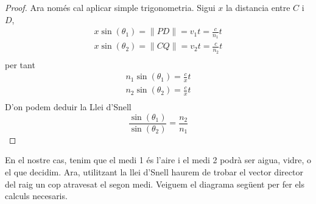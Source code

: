 \documentclass{article}
\begin{document}
\begin{proof}
Ara només cal aplicar simple trigonometria. Sigui $x$ la distancia entre  $C$ i  $D$,
 \begin{align*}
    x \sin(\theta_1) = \|PD\| = v_1t= \frac{c}{n_1} t  \\
    x \sin(\theta_2) = \|CQ\| = v_2t= \frac{c}{n_2} t  \\
\end{align*}
per tant 
\begin{align*}
   n_1 \sin(\theta_1) = \frac{c}{x}t \\
   n_2 \sin(\theta_2) = \frac{c}{x}t \\
\end{align*}
D'on podem deduir la Llei d'Snell
  \begin{equation*}
     \frac{\sin(\theta_1)}{\sin(\theta_2)}= \frac{n_2}{n_1}
  \end{equation*} 
\end{proof}


En el nostre cas, tenim que el medi 1 és l'aire i el medi 2 podrà ser aigua, vidre, o el que decidim.
Ara, utilitzant la llei d'Snell haurem de trobar el vector director del raig un cop atravesat el segon medi. Veiguem el diagrama
següent per fer els calculs necesaris.
\end{document}

